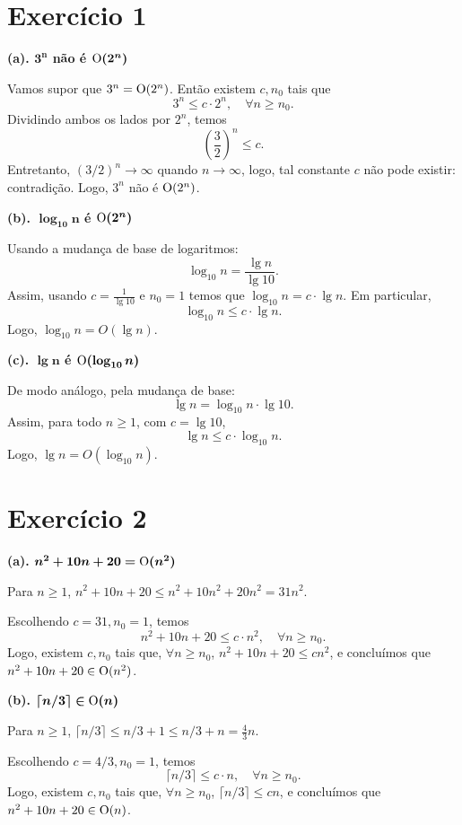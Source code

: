\documentclass[a4paper]{article}
\begin{document}
\section*{Exercício 1}

\textbf{(a). $\bm{3^n}$ não é $\text O \bm{(2^n)}$}

Vamos supor que $3^n = \text O(2^n)$. Então existem $c, n_0$ tais que
\[ 3^n \leq c \cdot 2^n, \quad \forall n \geq n_0. \]
Dividindo ambos os lados por $2^n$, temos
\[ \left(\frac{3}{2}\right)^n \leq c. \]
Entretanto, $(3/2)^n \to \infty$ quando $n \to \infty$, logo, tal constante $c$ não pode existir: contradição. Logo, $3^n$ não é $\text O(2^n)$.

\bigskip

\textbf{(b). $\bm{\log_{10} n}$ é $\text O \bm{(2^n)}$}

Usando a mudança de base de logaritmos:
\[ \log_{10} n = \frac{\lg n}{\lg 10}. \]
Assim, usando $c = \tfrac{1}{\lg 10}$ e $n_0 = 1$ temos que $\log_{10} n = c \cdot \lg n$. Em particular,
\[ \log_{10} n \leq c \cdot \lg n. \]
Logo, $\log_{10} n = O(\lg n)$.

\bigskip

\textbf{(c). $\bm{\lg n}$ é $\bm{\text O(\log_{10} n)}$}

De modo análogo, pela mudança de base:
\[ \lg n = \log_{10} n \cdot \lg 10. \]
Assim, para todo $n \geq 1$, com $c = \lg 10$,
\[ \lg n \leq c \cdot \log_{10} n. \]
Logo, $\lg n = O(\log_{10} n)$.

\newpage

\section*{Exercício 2}

\textbf{(a). $\bm{n^2 + 10n + 20 = \text O(n^2)}$}

Para $n \ge 1$, $n^2 + 10n + 20 \le n^2 + 10n^2 + 20 n^2 = 31 n^2.$

Escolhendo $c = 31, n_0 = 1$, temos
\[ n^2 + 10n + 20 \le c \cdot n^2, \quad \forall n \ge n_0. \]
Logo, existem $c, n_0$ tais que, $\forall n \geq n_0$, $n^2 + 10n + 20 \leq cn^2$, e concluímos que $n^2 + 10n + 20 \in \text O(n^2)$.

\bigskip

\textbf{(b). $\bm{\lceil n/3 \rceil \in \text O(n)}$}

Para $n \ge 1$, $\lceil n/3 \rceil \le n/3 + 1 \le n/3 + n = \frac{4}{3} n.$

Escolhendo $c = 4/3, n_0 = 1$, temos
\[ \lceil n/3 \rceil \le c \cdot n, \quad \forall n \ge n_0. \]
Logo, existem $c, n_0$ tais que, $\forall n \geq n_0$, $\lceil n/3 \rceil \leq cn$, e concluímos que $n^2 + 10n + 20 \in \text O(n)$.
\end{document}
